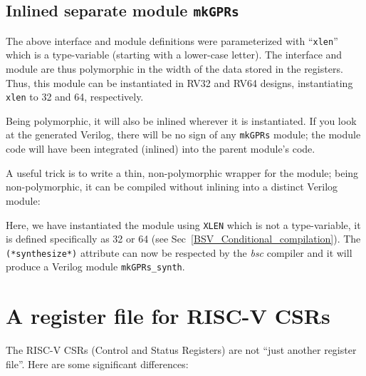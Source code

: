 \subsection{Inlined {\vs} separate module {\tt mkGPRs}}

The above interface and module definitions were parameterized with
``\verb|xlen|'' which is a type-variable (starting with a lower-case
letter).  The interface and module are thus polymorphic in the width
of the data stored in the registers.  Thus, this module can be
instantiated in RV32 and RV64 designs, instantiating \verb|xlen| to 32
and 64, respectively.

Being polymorphic, it will also be inlined wherever it is
instantiated.  If you look at the generated Verilog, there will be no
sign of any \verb|mkGPRs| module; the module code will have been
integrated (inlined) into the parent module's code.

A useful trick is to write a thin, non-polymorphic wrapper for the
module; being non-polymorphic, it can be compiled without inlining
into a distinct Verilog module:



Here, we have instantiated the module using \verb|XLEN| which is not a
type-variable, it is defined specifically as 32 or 64 (see
Sec~\ref{BSV_Conditional_compilation}).  The \verb|(*synthesize*)|
attribute can now be respected by the \emph{bsc} compiler and it will
produce a Verilog module \verb|mkGPRs_synth|.


\section{A register file for RISC-V CSRs}

\label{Sec_RISCV_CSRs}

The RISC-V CSRs (Control and Status Registers) are not ``just another
register file''.  Here are some significant differences:

